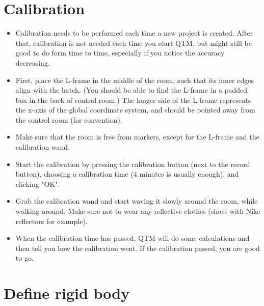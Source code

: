 \documentclass{article}
\begin{document}
\section{Calibration}
\begin{itemize}
    \item Calibration needs to be performed each time a new project is created. After that, calibration is not needed each time you start QTM, but might still be good to do form time to time, especially if you notice the accuracy decreasing.
    \item First, place the L-frame in the middle of the room, such that its inner edges align with the hatch. (You should be able to find the L-frame in a padded box in the back of control room.) The longer side of the L-frame represents the x-axis of the global coordinate system, and should be pointed away from the control room (for convention).
    \item Make sure that the room is free from markers, except for the L-frame and the calibration wand.
    \item Start the calibration by pressing the calibration button (next to the record button), choosing a calibration time (4 minutes is usually enough), and clicking "OK".
    \item Grab the calibration wand and start waving it slowly around the room, while walking around. Make sure not to wear any reflective clothes (shoes with Nike reflectors for example).
    \item When the calibration time has passed, QTM will do some calculations and then tell you how the calibration went. If the calibration passed, you are good to go.
\end{itemize}

\section{Define rigid body}
\end{document}

